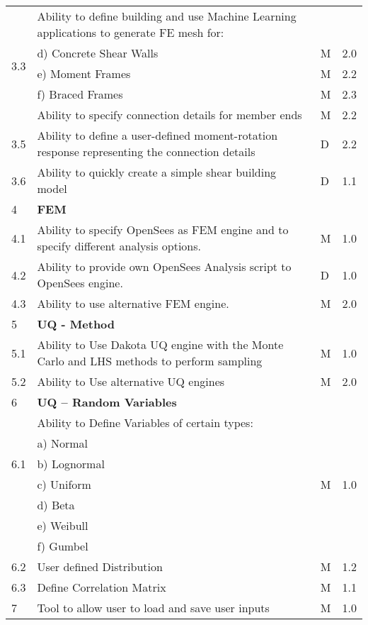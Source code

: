 \begin{table}[hbt!]
\begin{adjustbox}{max width=\textwidth}
\begin{tabular}{llll}
	\multirow{5}{*}{3.3} & Ability to define building and use Machine Learning applications to generate FE mesh for: &  &  \\ 
	 & d)     Concrete Shear Walls & M & 2.0 \\ 
	 & e)     Moment Frames & M & 2.2 \\ 
	 & f)     Braced Frames & M & 2.3  \\ \hline

	3.4 & Ability to specify connection details for member ends & M & 2.2 \\ \hline
	3.5 & Ability to define a user-defined moment-rotation response representing the connection details & D & 2.2 \\ \hline
	3.6 & Ability to quickly create a simple shear building model & D & 1.1 \\ \hline
	4 & \textbf{FEM} &  &  \\ \hline
	4.1 & Ability to specify OpenSees as FEM engine and to specify different analysis options. & M & 1.0 \\ \hline
	4.2 & Ability to provide own OpenSees Analysis script to OpenSees engine. & D & 1.0 \\ \hline
	4.3 & Ability to use alternative FEM engine. & M & 2.0 \\ \hline
	5 & \textbf{UQ - Method} &  &  \\ \hline
	5.1 & Ability to Use Dakota UQ engine with the Monte Carlo and LHS methods to perform sampling & M & 1.0 \\ \hline
	5.2 & Ability to Use alternative UQ engines & M & 2.0 \\ \hline
	6 & \textbf{UQ – Random Variables} &  &  \\ \hline
	\multirow{5}{*}{6.1} & Ability to Define Variables of certain types: &  &  \\ 
	 & a)     Normal &  &  \\ 
	 & b)     Lognormal &  &  \\ 
	 & c)     Uniform & M  & 1.0 \\ 
	 & d)     Beta &  &  \\ 
	 & e)     Weibull &  &  \\ 
	 & f)     Gumbel &  &  \\ \hline
	6.2 & User defined Distribution & M & 1.2 \\ \hline
	6.3 & Define Correlation Matrix & M & 1.1 \\ \hline
	7 & Tool to allow user to load and save user inputs & M & 1.0 \\ \hline

\end{tabular}
\end{adjustbox}
\end{table}
